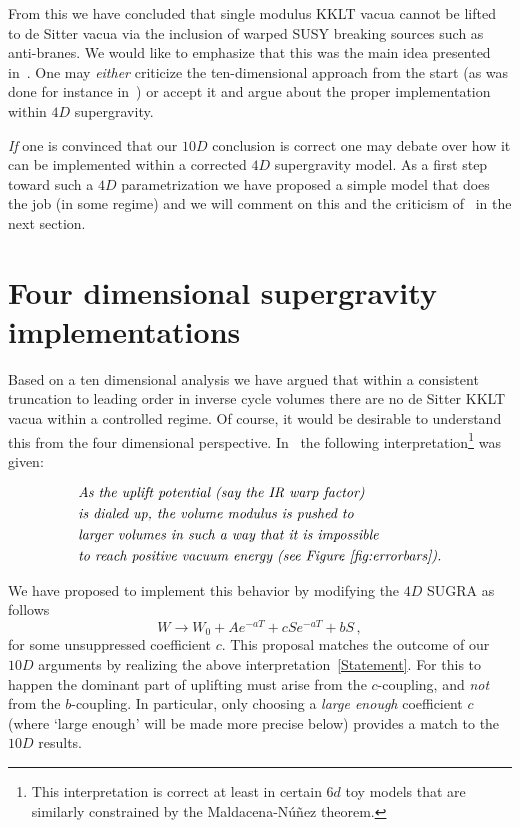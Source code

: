\documentclass[aps,prd,amsmath,amsfonts,a4paper,11pt,reprint,twocolumn,square,numbers,showpacs,superscriptaddress,floatfix,sort&compress,nofootinbib]{revtex4-1}
\begin{document}
From this we have concluded that single modulus KKLT vacua cannot be lifted to de Sitter vacua via the inclusion of warped SUSY breaking sources such as anti-branes. We would like to emphasize that this was the main idea presented in~\cite{Moritz:2017xto}. One may \textit{either} criticize the ten-dimensional approach from the start (as was done for instance in~\cite{Cicoli:2018kdo}) or accept it and argue about the proper implementation within $4D$ supergravity.



\textit{If} one is convinced that our $10D$ conclusion is correct one may debate over how it can be implemented within a corrected $4D$ supergravity model. As a first step toward such a $4D$ parametrization we have proposed a simple model that does the job (in some regime) and we will comment on this and the criticism of~\cite{Kallosh:2018wme} in the next section.  



\section{Four dimensional supergravity implementations}


Based on  a ten dimensional analysis we have argued that within a consistent truncation to leading order in inverse cycle volumes there are no de Sitter KKLT vacua within a controlled regime. Of course, it would be desirable to understand this from the four dimensional perspective. In~\cite{Moritz:2017xto} the following interpretation\footnote{This interpretation is correct at least in certain $6d$ toy models that are similarly constrained by the Maldacena-N\'{u}\~{n}ez theorem.  } was given: 

\begin{align}\label{Statement}
&\textit{As the uplift potential (say the IR warp factor)}\nonumber\\
&\textit{is dialed up, the volume modulus is pushed to}\nonumber\\
&\textit{larger volumes in such a way that it is impossible}\\
&\textit{to reach positive vacuum energy (see Figure~\ref{fig:errorbars}).}\nonumber 
\end{align}

We have proposed to implement this behavior by modifying the $4D$ SUGRA as follows
\begin{equation}\label{eq:WflattenedUplift1}
W\longrightarrow W_0+Ae^{-aT}+c S e^{-aT}+ b S\, ,
\end{equation}
for some unsuppressed coefficient $c$. This proposal matches the outcome of our $10D$ arguments by realizing the above interpretation~\eqref{Statement}. For this to happen the dominant part of uplifting must arise from the $c$-coupling, and \emph{not} from the $b$-coupling. In particular, only choosing a \textit{large enough} coefficient $c$ (where `large enough' will be made more precise below) provides a match to the $10D$ results.
\end{document}
